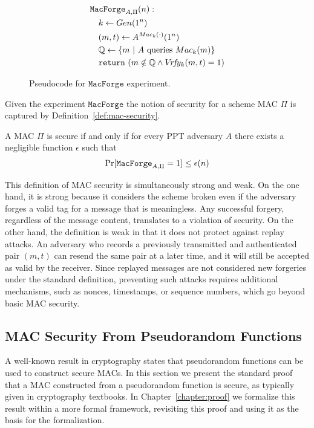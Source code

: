 \begin{figure}[htpb]
    \centering
    \begin{align*}
    &\mathtt{MacForge}_{A,\Pi}(n): \\
    &\quad k \gets Gen(1^n) \\
    &\quad (m,t) \gets A^{Mac_k(\cdot)}(1^n) \\
    &\quad \mathbb{Q} \gets \{m \ | \ A \ \text{queries} \ Mac_k(m) \} \\
    &\quad \mathtt{return}\,\,(m \notin \mathbb{Q} \land V\!r\!f\!y_k(m,t) = 1)
    \end{align*}
    \caption{Pseudocode for $\mathtt{MacForge}$ experiment.}
    \label{fig:macforge}
\end{figure}

Given the experiment $\mathtt{MacForge}$ the notion of security for a scheme MAC $\Pi$ is captured by Definition~\ref{def:mac-security}.

\begin{definition}\label{def:mac-security}
A MAC $\Pi$ is secure if and only if for every PPT adversary $A$ there exists a negligible function $\epsilon$ such that 
\begin{align}
\mathrm{Pr}[\mathtt{MacForge}_{A,\Pi} = 1] \leq \epsilon(n)
\end{align}
\end{definition}
This definition of MAC security is simultaneously strong and weak. On the one hand, it is strong because it considers the scheme broken even if the adversary forges a valid tag for a message that is meaningless. Any successful forgery, regardless of the message content, translates to a violation of security. On the other hand, the definition is weak in that it does not protect against replay attacks. An adversary who records a previously transmitted and authenticated pair $(m,t)$ can resend the same pair at a later time, and it will still be accepted as valid by the receiver. Since replayed messages are not considered new forgeries under the standard definition, preventing such attacks requires additional mechanisms, such as nonces, timestamps, or sequence numbers, which go beyond basic MAC security.

\subsection{MAC Security From Pseudorandom Functions}\label{subsec:mac-security}
A well-known result in cryptography states that pseudorandom functions can be used to construct secure MACs. In this section we present the standard proof that a MAC constructed from a pseudorandom function is secure, as typically given in cryptography textbooks. In Chapter~\ref{chapter:proof} we formalize this result within a more formal framework, revisiting this proof and using it as the basis for the formalization.

